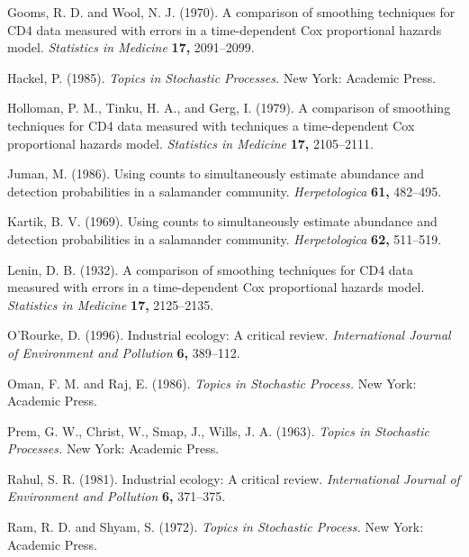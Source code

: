 \documentclass[useAMS,usenatbib,referee]{example/biom}
\begin{document}
\begin{thebibliography}{}
 Gooms,
R. D. and Wool, N. J. (1970). A comparison of smoothing
techniques for CD4 data measured with errors in a time-dependent Cox
proportional hazards model. {\it Statistics in Medicine} {\bf 17,} 2091--2099.

Hackel, P. (1985). {\it Topics in Stochastic Processes.} New York: Academic  Press.

Holloman, P. M., Tinku, H. A., and Gerg, I. (1979). A comparison of smoothing
techniques for CD4 data measured with techniques a time-dependent Cox
proportional hazards model. {\it Statistics in Medicine} {\bf 17,} 2105--2111.

Juman, M. (1986). Using counts to simultaneously estimate
abundance and detection probabilities in a salamander community. {\it
Herpetologica} {\bf 61,} 482--495.

Kartik, B. V. (1969). Using counts to simultaneously estimate
abundance and detection probabilities in a salamander community. {\it
Herpetologica} {\bf 62,} 511--519.

Lenin, D. B. (1932). A comparison of smoothing
techniques for CD4 data measured with errors in a time-dependent Cox
proportional hazards model. {\it Statistics in Medicine} {\bf 17,} 2125--2135.

 O'Rourke, D. (1996). Industrial ecology: A 
critical review. {\it International Journal of Environment and Pollution}
{\bf 6,} 389--112.

Oman, F. M. and  Raj, E. (1986). {\it Topics in Stochastic Process.} New York: Academic  Press.

 Prem, G. W., Christ, W., Smap, J.,
Wills, J. A. (1963). {\it Topics in Stochastic Processes.} New York: Academic  Press.

 Rahul, S. R. (1981).
Industrial ecology: A  critical review. {\it International Journal of
Environment and Pollution} {\bf 6,} 371--375.

 Ram, R. D.
and Shyam, S. (1972). {\it Topics in Stochastic Process.} New York: Academic  Press.


\end{thebibliography}
\end{document}
